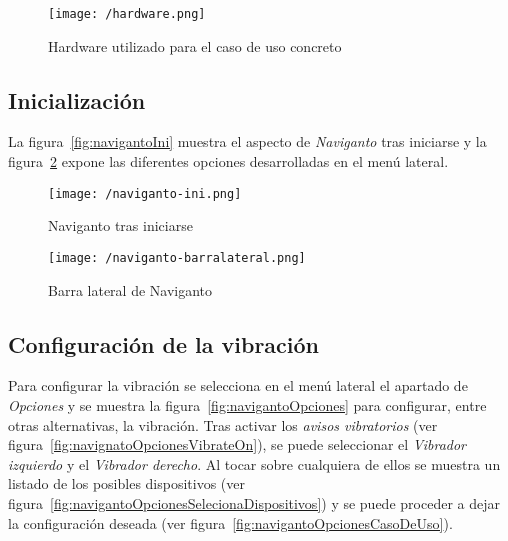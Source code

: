 \begin{figure}[!h]
  \begin{center}
    \texttt{[image: /hardware.png]}
    \caption{Hardware utilizado para el caso de uso concreto}
    \label{fig:hardware}
  \end{center}
\end{figure}

\subsection{Inicialización}

La figura~\ref{fig:navigantoIni} muestra el aspecto de \emph{Naviganto} tras iniciarse y la
figura~\ref{fig:navigantoBarra} expone las diferentes opciones desarrolladas en el menú lateral.

\begin{figure}[!h]
  \begin{minipage}[b]{0.5\linewidth}
    \begin{center}
      \texttt{[image: /naviganto-ini.png]}
      \caption{Naviganto tras iniciarse}
      \label{fig:navigantoIni}
    \end{center}
  \end{minipage}
  \begin{minipage}[b]{0.5\linewidth}
    \begin{center}
      \texttt{[image: /naviganto-barralateral.png]}
      \caption{Barra lateral de Naviganto}
      \label{fig:navigantoBarra}
    \end{center}
  \end{minipage}
\end{figure}

\subsection{Configuración de la vibración}

Para configurar la vibración se selecciona en el menú lateral el apartado de \emph{Opciones} y se
muestra la figura~\ref{fig:navigantoOpciones} para configurar, entre otras alternativas, la
vibración. Tras activar los \emph{avisos vibratorios} (ver
figura~\ref{fig:navignatoOpcionesVibrateOn}), se puede seleccionar el \emph{Vibrador izquierdo} y el
\emph{Vibrador derecho}. Al tocar sobre cualquiera de ellos se muestra un listado de los posibles
dispositivos (ver figura~\ref{fig:navigantoOpcionesSelecionaDispositivos}) y se puede proceder a
dejar la configuración deseada (ver figura~\ref{fig:navigantoOpcionesCasoDeUso}).

